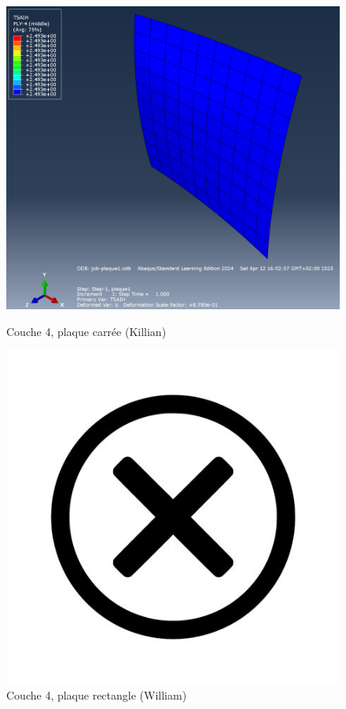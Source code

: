 \documentclass[a4paper,12pt]{article}
\begin{document}
\begin{figure}[h!]
	\centering
	\begin{minipage}{0.495\textwidth}
		\centering
		\includegraphics[width=\textwidth]{media/K_P1_L4_12042025.png} %
		\caption{Couche 4, plaque carrée (Killian)}
		\label{fig:image1}
	\end{minipage}
	\hfill
	\begin{minipage}{0.495\textwidth}
		\centering
		\includegraphics[width=\textwidth]{media/no-image.jpg} %
		\caption{Couche 4, plaque rectangle (William)}
		\label{fig:image2}
	\end{minipage}
\end{figure}
\end{document}
